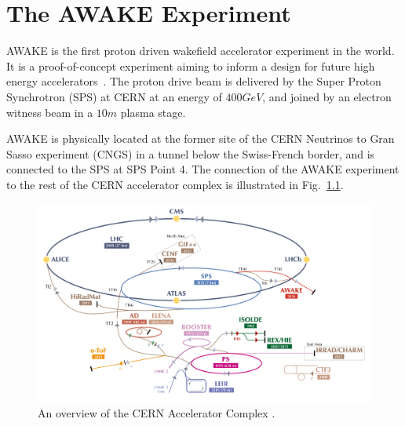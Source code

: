 %
%

\chapter{The AWAKE Experiment}
\label{Ch:WFA}

AWAKE is the first proton driven wakefield accelerator experiment in the world.
It is a proof-of-concept experiment aiming to inform a design for future high energy accelerators~\cite{gschwendtner:2016}.
The proton drive beam is delivered by the Super Proton Synchrotron (SPS) at CERN at an energy of $400\unit{GeV}$, and joined by an electron witness beam in a $10\unit{m}$ plasma stage.

AWAKE is physically located at the former site of the CERN Neutrinos to Gran Sasso experiment (CNGS) \cite{gschwendtner:2010} in a tunnel below the Swiss-French border, and is connected to the SPS at SPS Point 4.
The connection of the AWAKE experiment to the rest of the CERN accelerator complex is illustrated in Fig.~\ref{Fig:WFA:AccComp}.

\begin{figure}[hbt]
    \centering
    \includegraphics[width=0.99\linewidth,trim={20mm 0mm 20mm 0mm},clip]{figures/AcceleratorComplex}
    \caption{\label{Fig:WFA:AccComp}
        An overview of the CERN Accelerator Complex \cite{add:mobs:2016}.
    }
\end{figure}


